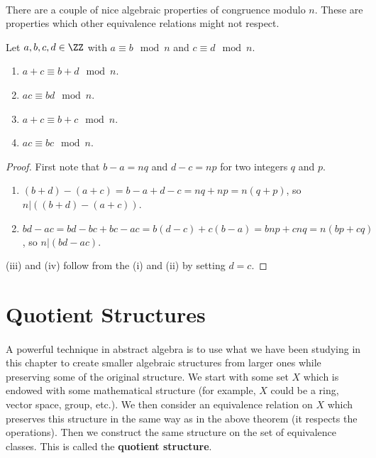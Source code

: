 \documentclass[../abstract_algebra.tex]{subfiles}
\begin{document}
        \paragraph{}
        There are a couple of nice algebraic properties of congruence modulo $n$.
        These are properties which other equivalence relations might not respect.
        \begin{theorem}\label{congruence-properties}
            Let $a,b,c,d\in\ZZ$ with $a\equiv b\mod n$ and $c\equiv d\mod n$.
            \begin{enumerate}[label={\upshape(\roman*)}]
                \item $a+c\equiv b+d\mod n$.
                \item $ac\equiv bd\mod n$.
                \item $a+c\equiv b+c\mod n$.
                \item $ac\equiv bc\mod n$.
            \end{enumerate}
        \end{theorem}
        \begin{proof}
            First note that $b-a=nq$ and $d-c=np$ for two integers $q$ and $p$.
            \begin{enumerate}[label={\upshape(\roman*)}]
                \item $(b+d)-(a+c)=b-a+d-c=nq+np=n(q+p)$, so $n|((b+d)-(a+c))$.
                \item $bd-ac=bd-bc+bc-ac=b(d-c)+c(b-a)=bnp+cnq=n(bp+cq)$, so $n|(bd-ac)$.
            \end{enumerate}
            (iii) and (iv) follow from the (i) and (ii) by setting $d=c$.
        \end{proof}

    \section{Quotient Structures}
        \paragraph{}
        A powerful technique in abstract algebra is to use what we have been studying in this chapter to create smaller algebraic structures from larger ones while preserving some of the original structure.
        We start with some set $X$ which is endowed with some mathematical structure (for example, $X$ could be a ring, vector space, group, etc.).
        We then consider an equivalence relation on $X$ which preserves this structure in the same way as in the above theorem (it respects the operations).
        Then we construct the same structure on the set of equivalence classes. This is called the \textbf{quotient structure}.
\end{document}
